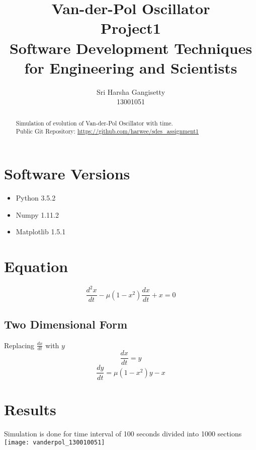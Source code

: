 \documentclass[a4paper]{article}
\title{Van-der-Pol Oscillator\\
			\large Project1 \\
			\large Software Development Techniques for Engineering and Scientists}
\author{Sri Harsha Gangisetty \\
					13001051}
\begin{document}
\maketitle






\begin{abstract}
Simulation of evolution of Van-der-Pol Oscillator with time. \\

Public Git Repository: \href{https://github.com/harwee/sdes_assignment1}{https://github.com/harwee/sdes\_assignment1}

\end{abstract}

\section{Software Versions}

\begin{itemize}
\item Python 3.5.2
\item Numpy 1.11.2
\item Matplotlib 1.5.1
\end{itemize}
\section{Equation}

\begin{equation}
\frac{d^2x}{dt}-\mu (1-x^2) \frac{dx}{dt} + x = 0
\end{equation}
\subsection{Two Dimensional Form}

	Replacing $ \frac{dx}{dt} $ with $ y $ \\
	\begin{equation}
	\frac{dx}{dt} = y
	\end{equation}
    \begin{equation}
	\frac{dy}{dt} = \mu (1-x^2)y -x
	\end{equation}
\newpage
\section{Results}
	Simulation is done for time interval of 100 seconds divided into 1000 sections
\centering
\texttt{[image: vanderpol\_130010051]}
\end{document}
